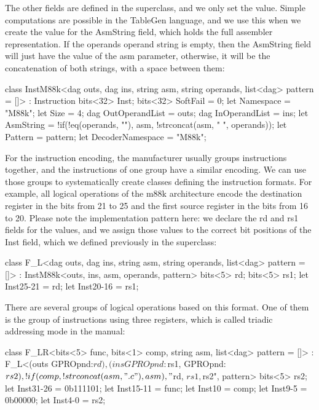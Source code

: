 The other fields are defined in the superclass, and we only set the value. Simple computations are possible in the TableGen language, and we use this when we create the value for the AsmString field, which holds the full assembler representation. If the operands operand string is empty, then the AsmString field will just have the value of the asm parameter, otherwise, it will be the concatenation of both strings, with a space between them:

\begin{cpp}
class InstM88k<dag outs, dag ins, string asm, string operands,
                list<dag> pattern = []>
    : Instruction {
    bits<32> Inst;
    bits<32> SoftFail = 0;
    let Namespace = "M88k";
    let Size = 4;
    dag OutOperandList = outs;
    dag InOperandList = ins;
    let AsmString = !if(!eq(operands, ""), asm,
                        !strconcat(asm, " ", operands));
    let Pattern = pattern;
    let DecoderNamespace = "M88k";
}
\end{cpp}

For the instruction encoding, the manufacturer usually groups instructions together, and the instructions of one group have a similar encoding. We can use those groups to systematically create classes defining the instruction formats. For example, all logical operations of the m88k architecture encode the destination register in the bits from 21 to 25 and the first source register in the bits from 16 to 20. Please note the implementation pattern here: we declare the rd and rs1 fields for the values, and we assign those values to the correct bit positions of the Inst field, which we defined previously in the superclass:

\begin{cpp}
class F_L<dag outs, dag ins, string asm, string operands,
          list<dag> pattern = []>
        : InstM88k<outs, ins, asm, operands, pattern> {
    bits<5> rd;
    bits<5> rs1;
    let Inst{25-21} = rd;
    let Inst{20-16} = rs1;
}
\end{cpp}

There are several groups of logical operations based on this format. One of them is the group of instructions using three registers, which is called triadic addressing mode in the manual:

\begin{cpp}
class F_LR<bits<5> func, bits<1> comp, string asm,
            list<dag> pattern = []>
    : F_L<(outs GPROpnd:$rd), (ins GPROpnd:$rs1, GPROpnd:$rs2),
            !if(comp, !strconcat(asm, ".c"), asm),
            "$rd, $rs1, $rs2", pattern> {
    bits<5> rs2;
    let Inst{31-26} = 0b111101;
    let Inst{15-11} = func;
    let Inst{10} = comp;
    let Inst{9-5} = 0b00000;
    let Inst{4-0} = rs2;
}
\end{cpp}

